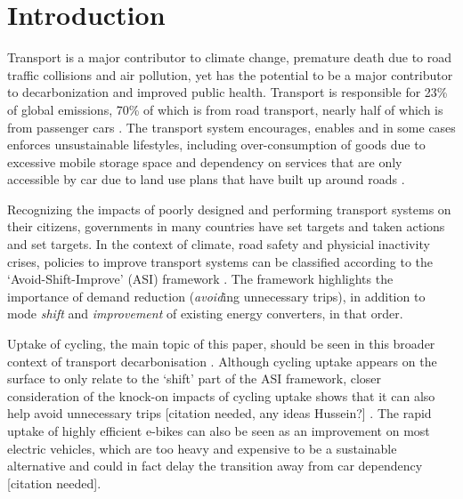 \documentclass[
  super,
  preprint,
  3p]{elsarticle}
\begin{document}
    \ifdefined\Shaded\renewenvironment{Shaded}{\begin{tcolorbox}[breakable, sharp corners, borderline west={3pt}{0pt}{shadecolor}, interior hidden, enhanced, boxrule=0pt, frame hidden]}{\end{tcolorbox}}\fi

\newpage{}

\hypertarget{introduction}{%
\section{Introduction}\label{introduction}}

Transport is a major contributor to climate change, premature death due
to road traffic collisions and air pollution, yet has the potential to
be a major contributor to decarbonization and improved public health.
Transport is responsible for 23\% of global emissions, 70\% of which is
from road transport, nearly half of which is from passenger cars
\citep{jaramillo2022}. The transport system encourages, enables and in
some cases enforces unsustainable lifestyles, including over-consumption
of goods due to excessive mobile storage space and dependency on
services that are only accessible by car due to land use plans that have
built up around roads \citep{gray2001, shergold2012, motte-baumvol2010}.

Recognizing the impacts of poorly designed and performing transport
systems on their citizens, governments in many countries have set
targets and taken actions and set targets. In the context of climate,
road safety and physicial inactivity crises, policies to improve
transport systems can be classified according to the
`Avoid-Shift-Improve' (ASI) framework \citep{jaramillo2022}. The
framework highlights the importance of demand reduction (\emph{avoid}ing
unnecessary trips), in addition to mode \emph{shift} and
\emph{improvement} of existing energy converters, in that order.

Uptake of cycling, the main topic of this paper, should be seen in this
broader context of transport decarbonisation \citep{brand2020}. Although
cycling uptake appears on the surface to only relate to the `shift' part
of the ASI framework, closer consideration of the knock-on impacts of
cycling uptake shows that it can also help avoid unnecessary trips
{[}citation needed, any ideas Hussein?{]} . The rapid uptake of highly
efficient e-bikes can also be seen as an improvement on most electric
vehicles, which are too heavy and expensive to be a sustainable
alternative and could in fact delay the transition away from car
dependency {[}citation needed{]}.
\end{document}
